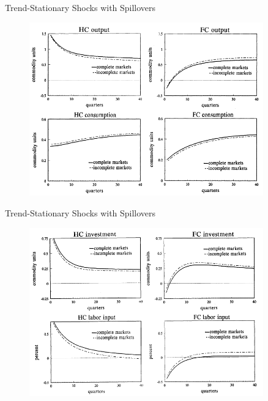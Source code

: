 \documentclass[10pt]{beamer}
\begin{document}

\begin{frame}{Trend-Stationary Shocks with Spillovers}
\begin{figure}[thbp]
  \centering
  \includegraphics[width=0.90\textwidth]{17.png}
\end{figure}
\end{frame}

\begin{frame}{Trend-Stationary Shocks with Spillovers}
\begin{figure}[thbp]
  \centering
  \includegraphics[width=0.90\textwidth]{18.png}
\end{figure}
\end{frame}
\end{document}
